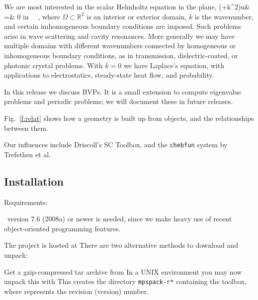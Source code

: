 \documentclass[12pt]{article}
\begin{document}
We are most interested in the scalar Helmholtz equation in the plane,
\bea
(\Delta+k^2)u& =& 0 \qquad \mbox{in } \Omega~,
\eea
where $\Omega \subset \mathbb{R}^2$ is an interior or exterior
domain, $k$ is the wavenumber, and certain
imhomogeneous boundary conditions are imposed.
Such problems arise in wave scattering and cavity resonances.
More generally we may have multiple domains with different
wavenumbers connected by homogeneous or inhomogeneous boundary conditions,
as in transmission, dielectric-coated, or photonic crystal problems.
With $k=0$ we have Laplace's equation, with applications to
electrostatics, steady-state heat flow, and probability.

In this release we discuss BVPs.
It is a small extension to compute
eigenvalue problems and periodic problems; we will document these in
future releases.

Fig.~\ref{f:relat} shows how a geometry is built up from objects, and the
relationships between them.

Our influences include Driscoll's SC Toolbox, and the {\tt chebfun} system
by Trefethen et al.


\bfi %
\efi

\subsection{Installation}

Requirements:
\bi
\item \matlab\ version 7.6 (2008a) or newer is needed,
since we make heavy use of recent object-oriented programming features.
\ei

The project is hosted at
There are two alternative methods to download and unpack:
\ben
\item
Get a gzip-compressed tar archive from
In a UNIX environment you may now
unpack this with
This creates the directory {\tt mpspack-r*} containing the toolbox,
where {\tt *} represents the revision (version) number.
\end{document}
